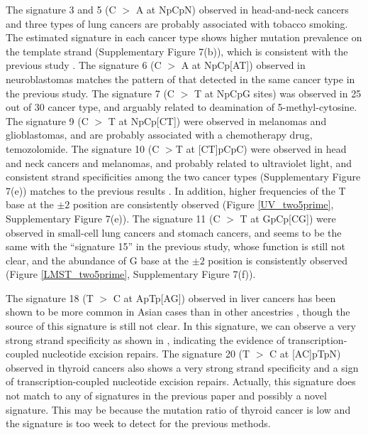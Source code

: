 The signature 3 and 5 (C $>$ A at NpCpN) observed in head-and-neck cancers and three types of lung cancers are probably associated with tobacco smoking.
The estimated signature in each cancer type shows higher mutation prevalence on the template strand (Supplementary Figure 7(b)), 
which is consistent with the previous study \cite{pmid12379884, pmid23318258}.
The signature 6 (C $>$ A at NpCp[AT]) observed in neuroblastomas matches the pattern of that detected in the same cancer type in the previous study.
The signature 7 (C $>$ T at NpCpG sites) was observed in 25 out of 30 cancer type, and arguably related to deamination of 5-methyl-cytosine.
The signature 9 (C $>$ T at NpCp[CT]) were observed in melanomas and glioblastomas, and are probably associated with a chemotherapy drug, temozolomide.
The signature 10 (C $>$T at [CT]pCpC) were observed in head and neck cancers and melanomas, and probably related to ultraviolet light,
and consistent strand specificities among the two cancer types (Supplementary Figure 7(e)) matches to the previous results \cite{pmid23318258}.   
In addition, higher frequencies of the T base at the $\pm 2$ position are consistently observed (Figure \ref{UV_two5prime}, Supplementary Figure 7(e)).
The signature 11 (C $>$ T at GpCp[CG]) were observed in small-cell lung cancers and stomach cancers,
and seems to be the same with the ``signature 15'' in the previous study, whose function is still not clear,
and the abundance of G base at the $\pm 2$ position is consistently observed (Figure \ref{LMST_two5prime}, Supplementary Figure 7(f)).


The signature 18 (T $>$ C at ApTp[AG]) observed in liver cancers has been shown to be more common in Asian cases than in other ancestries \cite{pmid25362482}, 
though the source of this signature is still not clear. 
In this signature, we can observe a very strong strand specificity as shown in \cite{pmid25362482, pmid23318258},
 indicating the evidence of transcription-coupled nucleotide excision repairs.
The signature 20 (T $>$ C at [AC]pTpN) observed in thyroid cancers also shows a very strong strand specificity 
and a sign of transcription-coupled nucleotide excision repairs.
Actually, this signature does not match to any of signatures in the previous paper \cite{pmid23318258} and possibly a novel signature.
This may be because the mutation ratio of thyroid cancer is low and the signature is too week to detect for the previous methods.


